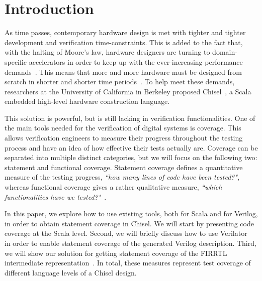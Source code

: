\documentclass[conference]{IEEEtran}
\newcommand{\martin}[1]{{\color{blue} Martin: #1}}
\begin{document}

\section{Introduction}
\label{sec:objectives}
As time passes, contemporary hardware design is met with tighter and tighter development and verification time-constraints. This is added to the fact that, with the halting of Moore's law, hardware designers are turning to domain-specific accelerators in order to keep up with the ever-increasing performance demands~\cite{henn-patt:turing:2019}. This means that more and more hardware must be designed from scratch in shorter and shorter time periods~\cite{domain-hw-acc:2020}.  To help meet these demands, researchers at the University of California in Berkeley proposed Chisel~\cite{chisel:dac2012}, a Scala embedded high-level hardware construction language.

This solution is powerful, but is still lacking in verification functionalities. One of the main tools needed for the verification of digital systems is coverage. This allows verification engineers to measure their progress throughout the testing process and have an idea of how effective their tests actually are. Coverage can be separated into multiple distinct categories, but we will focus on the following two: statement and functional coverage. Statement coverage defines a quantitative measure of the testing progress, \textit{``how many lines of code have been tested?"}, whereas functional coverage gives a rather qualitative measure, \textit{``which functionalities have we tested?"}~\cite{spear2008systemverilog}.


In this paper, we explore how to use existing tools, both for Scala and for Verilog, in order to obtain statement coverage in Chisel. We will start by presenting code coverage at the Scala level. Second, we will briefly discuss how to use Verilator~\cite{verilator} in order to enable statement coverage of the generated Verilog description. Third, we will show our solution for getting statement coverage of the FIRRTL intermediate representation~\cite{firrtl}. In total, these measures represent test coverage of different language levels of a Chisel design.
\end{document}

